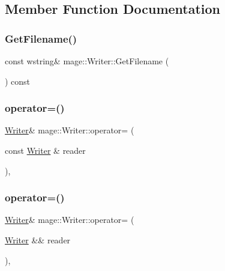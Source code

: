 \subsection{Member Function Documentation}
\hypertarget{classmage_1_1_writer_aa874f2ee6cdd6663078d213f10d984f1}{}\label{classmage_1_1_writer_aa874f2ee6cdd6663078d213f10d984f1} 
\subsubsection{\texorpdfstring{Get\+Filename()}{GetFilename()}}
{\footnotesize\ttfamily const wstring\& mage\+::\+Writer\+::\+Get\+Filename (\begin{DoxyParamCaption}{ }\end{DoxyParamCaption}) const}

\hypertarget{classmage_1_1_writer_a14fff6d050ad263bd351b26b86ca4186}{}\label{classmage_1_1_writer_a14fff6d050ad263bd351b26b86ca4186} 
\subsubsection{\texorpdfstring{operator=()}{operator=()}\hspace{0.1cm}{\footnotesize\ttfamily [1/2]}}
{\footnotesize\ttfamily \hyperlink{classmage_1_1_writer}{Writer}\& mage\+::\+Writer\+::operator= (\begin{DoxyParamCaption}\item[{const \hyperlink{classmage_1_1_writer}{Writer} \&}]{reader }\end{DoxyParamCaption})\hspace{0.3cm}{\ttfamily [private]}, {\ttfamily [delete]}}

\hypertarget{classmage_1_1_writer_aacbdb763abf79c5753b89bd336f56ea3}{}\label{classmage_1_1_writer_aacbdb763abf79c5753b89bd336f56ea3} 
\subsubsection{\texorpdfstring{operator=()}{operator=()}\hspace{0.1cm}{\footnotesize\ttfamily [2/2]}}
{\footnotesize\ttfamily \hyperlink{classmage_1_1_writer}{Writer}\& mage\+::\+Writer\+::operator= (\begin{DoxyParamCaption}\item[{\hyperlink{classmage_1_1_writer}{Writer} \&\&}]{reader }\end{DoxyParamCaption})\hspace{0.3cm}{\ttfamily [private]}, {\ttfamily [delete]}}

